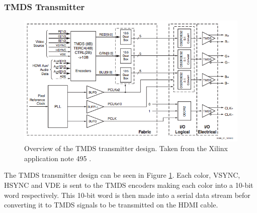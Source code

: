 \subsubsection{TMDS Transmitter}
\begin{figure}[h!]
    \centering
    \includegraphics[width=\linewidth]{img/TMDStransmitterdesign.png}
    \caption{Overview of the TMDS transmitter design. Taken from the Xilinx application note 495 \cite{xapp495}.}
    \label{fig:TMDSTransmitter}
\end{figure}
The TMDS transmitter design can be seen in Figure \ref{fig:TMDSTransmitter}.
Each color, VSYNC, HSYNC and VDE is sent to the TMDS encoders making each color into a 10-bit word respectively. This 10-bit word is then made into a serial data stream befor converting it to TMDS signals to be transmitted on the HDMI cable.

